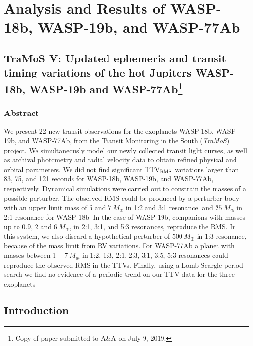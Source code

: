 \chapter{Analysis and Results of WASP-18b, WASP-19b, and WASP-77Ab}\label{chap:paper}

\section*{TraMoS V: Updated ephemeris and transit timing variations of the hot Jupiters WASP-18b, WASP-19b and WASP-77Ab\footnote{Copy of paper submitted to A\&A on July 9, 2019.}}


\subsection*{Abstract}

We present 22 new transit observations for the exoplanets WASP-18b, WASP-19b, and WASP-77Ab, from the Transit Monitoring in the South (\emph{TraMoS}) project. We simultaneously model our newly collected transit light curves, as well as archival photometry and radial velocity data to obtain refined physical and orbital parameters. We did not find significant $\rm TTV_{RMS}$ variations larger than 83, 75, and 121 seconds for WASP-18b, WASP-19b, and WASP-77Ab, respectively. Dynamical simulations were carried out to constrain the masses of a possible perturber. The observed RMS could be produced by a perturber body with an upper limit mass of 5 and $7~M_{\oplus}$ in 1:2 and 3:1 resonance, and $25~M_{\oplus}$ in 2:1 resonance for WASP-18b. In the case of WASP-19b, companions with masses up to 0.9, 2 and $6~M_{\oplus}$, in 2:1, 3:1, and 5:3 resonances, reproduce the RMS. In this system, we also discard a hypothetical perturber of $500~M_{\oplus}$ in 1:3 resonance, because of the mass limit from RV variations. For WASP-77Ab a planet with masses between $1-7~M_{\oplus}$ in 1:2, 1:3, 2:1, 2:3, 3:1, 3:5, 5:3 resonances could reproduce the observed RMS in the TTVs. Finally, using a Lomb-Scargle period search we find no evidence of a periodic trend on our TTV data for the three exoplanets.

\section{Introduction}


